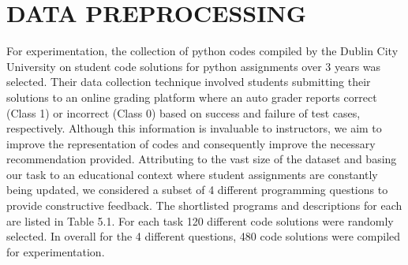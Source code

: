 
\chapter{DATA PREPROCESSING} %

For experimentation, the collection of python codes compiled by the Dublin City University\cite{A} on student code solutions for python assignments over 3 years was selected. Their data collection technique involved students submitting their solutions to an online grading platform where an auto grader reports correct (Class 1) or incorrect (Class 0) based on success and failure of test cases, respectively. Although this information is invaluable to instructors, we aim to improve the representation of codes and consequently improve the necessary recommendation provided. Attributing to the vast size of the dataset and basing our task to an educational context where student assignments are constantly being updated, we considered a subset of 4 different programming questions to provide constructive feedback. The shortlisted programs and descriptions for each are listed in Table 5.1. For each task 120 different code solutions were randomly selected. In overall for the 4 different questions, 480 code solutions were compiled for experimentation. 


\begin{table}[h]
\centering
{}
\caption{Questions and Description}
\label{tab:ques}
\end{table}

